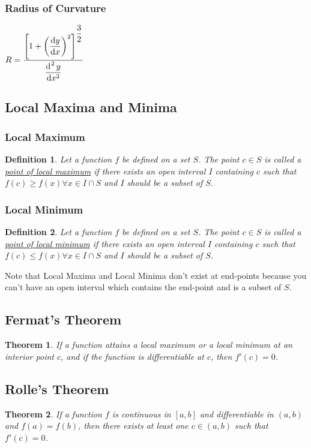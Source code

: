 \documentclass[14]{article}
\newtheorem{theorem}{Theorem}
\newtheorem{define}{Definition}
\theoremstyle{definition}
\theoremstyle{case}
\begin{document}
\subsubsection{Radius of Curvature}
$R = \dfrac{\left[ 1 + \left(\dfrac{\dif y}{\dif x}\right)^2\right]^{\dfrac32}}{\dfrac{\dif^{\;2}y}{\dif x ^2}}$
\pagebreak
\subsection{Local Maxima and Minima}
\subsubsection{Local Maximum}
\begin{define}
Let a function $f$ be defined on a set $S$. The point $c \in S$ is called a \underline{point of local maximum} if there exists an open interval $I$ containing $c$ such that $f(c) \geq f(x) \forall x \in I \cap S$ and $I$ should be a subset of $S$.
\end{define}
\subsubsection{Local Minimum}
\begin{define}
Let a function $f$ be defined on a set $S$. The point $c \in S$ is called a \underline{point of local minimum} if there exists an open interval $I$ containing $c$ such that $f(c) \leq f(x) \forall x \in I \cap S$ and $I$ should be a subset of $S$.
\end{define}
Note that Local Maxima and Local Minima don't exist at end-points because you can't have an open interval which contains the end-point and is a subset of $S$.
\subsection{Fermat's Theorem}
\begin{theorem}
If a function attains a local maximum or a local minimum at an interior point $c$, and if the function is differentiable at $c$, then $f'(c) = 0$.
\end{theorem}
\subsection{Rolle's Theorem}
\begin{theorem}
If a function $f$ is continuous in $[a, b]$ and differentiable in $(a, b)$ and $f(a) = f(b)$, then there exists at least one $c \in (a, b)$ such that $f'(c) = 0$.
\end{theorem}
\end{document}
